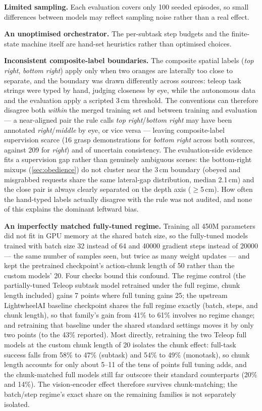 \textbf{Limited sampling.} Each evaluation covers only 100 seeded episodes, so small differences between models may reflect sampling noise rather than a real effect.

\textbf{An unoptimised orchestrator.} The per-subtask step budgets and the finite-state machine itself are hand-set heuristics rather than optimised choices.

\textbf{Inconsistent composite-label boundaries.} The composite spatial labels (\emph{top right}, \emph{bottom right}) apply only when two oranges are laterally too close to separate, and the boundary was drawn differently across sources: teleop task strings were typed by hand, judging closeness by eye, while the autonomous data and the evaluation apply a scripted 3\,cm threshold. The conventions can therefore disagree both \emph{within} the merged training set and between training and evaluation --- a near-aligned pair the rule calls \emph{top right}/\emph{bottom right} may have been annotated \emph{right}/\emph{middle} by eye, or vice versa --- leaving composite-label supervision scarce (16 grasp demonstrations for \emph{bottom right} across both sources, against 209 for \emph{right}) and of uncertain consistency. The evaluation-side evidence fits a supervision gap rather than genuinely ambiguous scenes: the bottom-right mixups (\cref{sec:obedience}) do not cluster near the 3\,cm boundary (obeyed and misgrabbed requests share the same lateral-gap distribution, median 2.1\,cm) and the close pair is always clearly separated on the depth axis ($\geq$5\,cm). How often the hand-typed labels actually disagree with the rule was not audited, and none of this explains the dominant leftward bias.

\textbf{An imperfectly matched fully-tuned regime.} Training all \num{450}M parameters did not fit in GPU memory at the shared batch size, so the fully-tuned models trained with batch size 32 instead of 64 and \num{40000} gradient steps instead of \num{20000} --- the same number of samples seen, but twice as many weight updates --- and kept the pretrained checkpoint's action-chunk length of 50 rather than the custom models' 20. Four checks bound this confound. The regime control (the partially-tuned Teleop subtask model retrained under the full regime, chunk length included) gains 7 points where full tuning gains 25; the upstream LightwheelAI baseline checkpoint shares the full regime exactly (batch, steps, and chunk length), so that family's gain from 41\% to 61\% involves no regime change; and retraining that baseline under the shared standard settings moves it by only two points (to the 43\% reported). Most directly, retraining the two Teleop full models at the custom chunk length of 20 isolates the chunk effect: full-task success falls from 58\% to 47\% (subtask) and 54\% to 49\% (monotask), so chunk length accounts for only about 5--11 of the tens of points full tuning adds, and the chunk-matched full models still far outscore their standard counterparts (20\% and 14\%). The vision-encoder effect therefore survives chunk-matching; the batch/step regime's exact share on the remaining families is not separately isolated.

